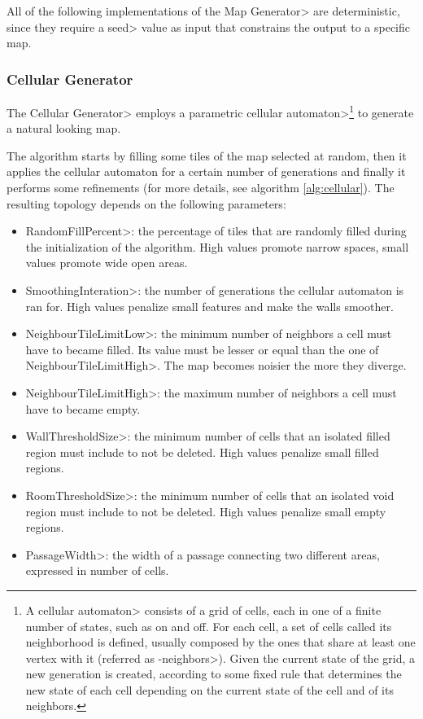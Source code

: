 All of the following implementations of the \<Map Generator> are deterministic, since they require a \<seed> value as input that constrains the output to a specific map.


\subsubsection{Cellular Generator}

The \<Cellular Generator> employs a parametric \<cellular automaton>\footnote{A \<cellular automaton> consists of a grid of cells, each in one of a finite number of states, such as on and off. For each cell, a set of cells called its neighborhood is defined, usually composed by the ones that share at least one vertex with it (referred as -neighbors>). Given the current state of the grid, a new generation is created, according to some fixed rule that determines the new state of each cell depending on the current state of the cell and of its neighbors.} to generate a natural looking map. 

\par

The algorithm starts by filling some tiles of the map selected at random, then it applies the cellular automaton for a certain number of generations and finally it performs some refinements (for more details, see algorithm \ref{alg:cellular}). The resulting topology depends on the following parameters:

\begin{itemize}
\item \<RandomFillPercent>: the percentage of tiles that are randomly filled during the initialization of the algorithm. High values promote narrow spaces, small values promote wide open areas.
\item \<SmoothingInteration>: the number of generations the cellular automaton is ran for. High values penalize small features and make the walls smoother. 
\item \<NeighbourTileLimitLow>: the minimum number of neighbors a cell must have to became filled. Its value must be lesser or equal than the one of \<NeighbourTileLimitHigh>. The map becomes noisier the more they diverge.
\item \<NeighbourTileLimitHigh>: the maximum number of neighbors a cell must have to became empty.
\item \<WallThresholdSize>: the minimum number of cells that an isolated filled region must include to not be deleted. High values penalize small filled regions.
\item \<RoomThresholdSize>: the minimum number of cells that an isolated void region must include to not be deleted. High values penalize small empty regions.
\item \<PassageWidth>: the width of a passage connecting two different areas, expressed in number of cells.
\end{itemize}

